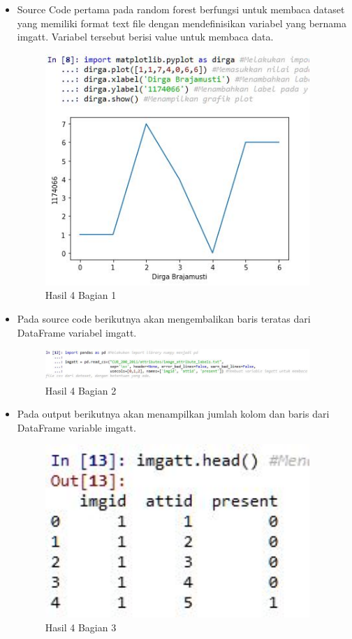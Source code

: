 \begin{itemize}
\item Source Code pertama pada random forest berfungsi untuk membaca dataset yang memiliki format text file dengan mendefinisikan variabel yang bernama imgatt. Variabel tersebut berisi value untuk membaca data.

\begin{figure}[H]
\centerline{\includegraphics[width=10cm]{figures/1174074/3/6.jpg}}
\caption{Hasil 4 Bagian 1}
\label{labelgambar}
\end{figure}

\item Pada source code berikutnya akan mengembalikan baris teratas dari DataFrame variabel imgatt.

\begin{figure}[H]
\centerline{\includegraphics[width=10cm]{figures/1174074/3/7.jpg}}
\caption{Hasil 4 Bagian 2}
\label{labelgambar}
\end{figure}

\item Pada output berikutnya akan menampilkan jumlah kolom dan baris dari DataFrame variable imgatt.

\begin{figure}[H]
\centerline{\includegraphics[width=10cm]{figures/1174074/3/8.jpg}}
\caption{Hasil 4 Bagian 3}
\label{labelgambar}
\end{figure}


\end{itemize}

